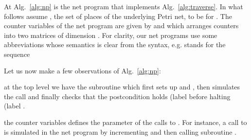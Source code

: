 \documentclass{fsttcs}
\begin{document}
At Alg.~\ref{alg:np} is the net program that implements
Alg.~\ref{alg:traverse}.  In what follows assume , the set of places of
the underlying Petri net, to be  for .  The
counter variables of the net program are given by  and   which arranges counters into two matrices of dimension .  For clarity, our net programs use some abbreviations whose
semantics is clear from the syntax, e.g.   stands for the sequence
 

Let us now make a few observations of Alg.~\ref{alg:np}:

\noindent \textbullet{} at the top level we have the subroutine  which first sets up
	 and ,
	then simulates the call  and finally checks
	that the postcondition holds (label  before halting (label . 

\noindent \textbullet{} the counter variables  defines
		the parameter of the calls to . For instance, a call
		to  is simulated in the net program by incrementing 
		and then calling subroutine .
\end{document}
